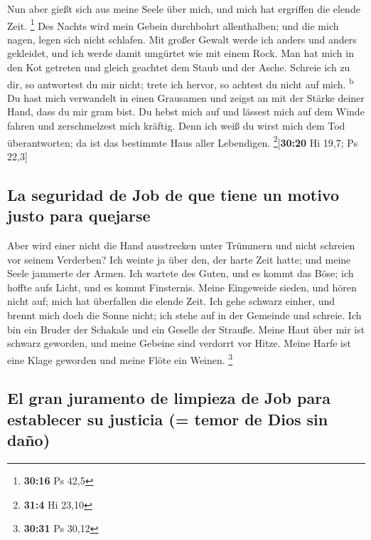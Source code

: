  Nun aber gießt sich aus meine Seele über mich, und mich
hat ergriffen die elende Zeit. \footnote{\textbf{30:16} Ps 42,5}
 Des Nachts wird mein Gebein durchbohrt allenthalben; und
die mich nagen, legen sich nicht schlafen.  Mit großer
Gewalt werde ich anders und anders gekleidet, und ich werde damit
umgürtet wie mit einem Rock.  Man hat mich in den Kot
getreten und gleich geachtet dem Staub und der Asche. 
Schreie ich zu dir, so antwortest du mir nicht; trete ich hervor, so
achtest du nicht auf mich. \textsuperscript{b}  Du hast
mich verwandelt in einen Grausamen und zeigst an mit der Stärke deiner
Hand, dass du mir gram bist.  Du hebst mich auf und
lässest mich auf dem Winde fahren und zerschmelzest mich kräftig.
 Denn ich weiß du wirst mich dem Tod überantworten; da
ist das bestimmte Haus aller Lebendigen. \footnote{\textbf{31:4} Hi
  23,10}{[}\textbf{30:20} Hi 19,7; Ps 22,3{]}

\hypertarget{la-seguridad-de-job-de-que-tiene-un-motivo-justo-para-quejarse}{%
\subsection{La seguridad de Job de que tiene un motivo justo para
quejarse}\label{la-seguridad-de-job-de-que-tiene-un-motivo-justo-para-quejarse}}

 Aber wird einer nicht die Hand ausstrecken unter
Trümmern und nicht schreien vor seinem Verderben?  Ich
weinte ja über den, der harte Zeit hatte; und meine Seele jammerte der
Armen.  Ich wartete des Guten, und es kommt das Böse; ich
hoffte aufs Licht, und es kommt Finsternis.  Meine
Eingeweide sieden, und hören nicht auf; mich hat überfallen die elende
Zeit.  Ich gehe schwarz einher, und brennt mich doch die
Sonne nicht; ich stehe auf in der Gemeinde und schreie. 
Ich bin ein Bruder der Schakale und ein Geselle der Strauße.
 Meine Haut über mir ist schwarz geworden, und meine
Gebeine sind verdorrt vor Hitze.  Meine Harfe ist eine
Klage geworden und meine Flöte ein Weinen. \footnote{\textbf{30:31} Ps
  30,12}

\hypertarget{el-gran-juramento-de-limpieza-de-job-para-establecer-su-justicia-temor-de-dios-sin-dauxf1o}{%
\subsection{El gran juramento de limpieza de Job para establecer su
justicia (= temor de Dios sin
daño)}\label{el-gran-juramento-de-limpieza-de-job-para-establecer-su-justicia-temor-de-dios-sin-dauxf1o}}

